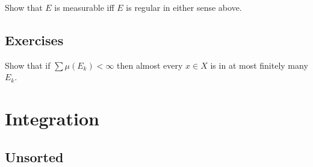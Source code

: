 \begin{problem}[?]

Show that \(E\) is measurable iff \(E\) is regular in either sense
above.

\end{problem}

\hypertarget{exercises}{%
\subsection{Exercises}\label{exercises}}

\begin{problem}[?]

Show that if \(\sum \mu(E_k) < \infty\) then almost every \(x\in X\) is
in at most finitely many \(E_k\).

\end{problem}

\hypertarget{integration}{%
\section{Integration}\label{integration}}

\hypertarget{unsorted}{%
\subsection{Unsorted}\label{unsorted}}

